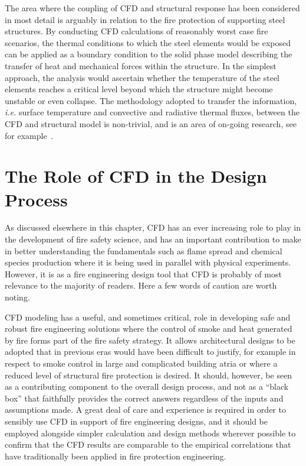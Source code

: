 \documentclass[graybox]{svmult}
\begin{document}
The area where the coupling of CFD and structural response has been considered in most detail is arguably in relation to the fire protection of supporting steel structures. By conducting CFD calculations of reasonably worst case fire scenarios, the thermal conditions to which the steel elements would be exposed can be applied as a boundary condition to the solid phase model describing the transfer of heat and mechanical forces within the structure. In the simplest approach, the analysis would ascertain whether the temperature of the steel elements reaches a critical level beyond which the structure might become unstable or even collapse. The methodology adopted to transfer the information, {\em i.e.} surface temperature and convective and radiative thermal fluxes, between the CFD and structural model is non-trivial, and is an area of on-going research, see for example~\cite{Welch}.





\section{The Role of CFD in the Design Process}

As discussed elsewhere in this chapter, CFD has an ever increasing role to play in the development of fire safety science, and has an important contribution to make in better understanding the fundamentals such as flame spread and chemical species production where it is being used in parallel with physical experiments. However, it is as a fire engineering design tool that CFD is probably of most relevance to the majority of readers. Here a few words of caution are worth noting.

CFD modeling has a useful, and sometimes critical, role in developing safe and robust fire engineering solutions where the control of smoke and heat generated by fire forms part of the fire safety strategy. It allows architectural designs to be adopted that in previous eras would have been difficult to justify, for example in respect to smoke control in large and complicated building atria or where a reduced level of structural fire protection is desired. It should, however, be seen as a contributing component to the overall design process, and not as a ``black box'' that faithfully provides the correct answers regardless of the inputs and assumptions made. A great deal of care and experience is required in order to sensibly use CFD in support of fire engineering designs, and it should be employed alongside simpler calculation and design methods wherever possible to confirm that the CFD results are comparable to the empirical correlations that have traditionally been applied in fire protection engineering.
\end{document}
